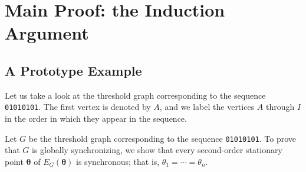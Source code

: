 \documentclass[11pt,reqno]{amsart}
\theoremstyle{definition}
\begin{document}
\section{Main Proof: the Induction Argument}\label{main_pf}
\subsection{A Prototype Example}
Let us take a look at the threshold graph corresponding to the sequence \texttt{01010101}. The first vertex is denoted by $A$, and we label the vertices $A$ through $I$ in the order in which they appear in the sequence.

Let $G$ be the threshold graph corresponding to the sequence \texttt{01010101}. 
To prove that $G$ is globally synchronizing, we show that every second-order stationary point $\boldsymbol{\theta}$ of $E_G(\boldsymbol{\theta})$ is synchronous; that is, 
$\theta_1 = \cdots = \theta_n$.
\end{document}
